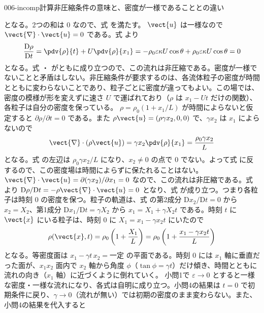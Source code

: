 \documentclass[uplatex,dvipdfmx,a4paper,11pt]{jsarticle}
\begin{document}
\begin{mondai}{006-incomp}{計算}{非圧縮条件の意味と、密度が一様であることとの違い}
\begin{tadashii}
となる。2つの和は 0 なので、式  を満たす。
 $\vect{u}$ は一様なので $\vect{\nabla}\cdot\vect{u} = 0$ である。式  より
\[ \frac{\mathrm{D}\rho}{\mathrm{D}t} = \pdv{\rho}{t} + U\pdv{\rho}{x_1} = -\rho_0\varepsilon\kappa U\cos\theta + \rho_0\varepsilon\kappa U\cos\theta = 0 \]
となる。式 ・ がともに成り立つので、この流れは非圧縮である。密度が一様でないことと矛盾はしない。非圧縮条件が要求するのは、各流体粒子の密度が時間とともに変わらないことであり、粒子ごとに密度が違ってもよい。この場では、密度の模様が形を変えずに速さ $U$ で運ばれており（$\rho$ は $x_1 - Ut$ だけの関数）、各粒子は自分の密度を保っている。
 $\rho = \rho_0(1 + x_1/L)$ が時間によらないと仮定すると $\partial\rho/\partial t = 0$ である。また $\rho\vect{u} = (\rho\gamma x_2, 0, 0)$ で、$\gamma x_2$ は $x_1$ によらないので
\[ \vect{\nabla}\cdot(\rho\vect{u}) = \gamma x_2\pdv{\rho}{x_1} = \frac{\rho_0\gamma x_2}{L} \]
となる。式  の左辺は $\rho_0\gamma x_2/L$ になり、$x_2 \neq 0$ の点で 0 でない。よって式  に反するので、この密度場は時間によらずに保たれることはない。
 $\vect{\nabla}\cdot\vect{u} = \partial(\gamma x_2)/\partial x_1 = 0$ なので、この流れは非圧縮である。式  より $\mathrm{D}\rho/\mathrm{D}t = -\rho\vect{\nabla}\cdot\vect{u} = 0$ となり、式  が成り立つ。つまり各粒子は時刻 0 の密度を保つ。粒子の軌道は、式  の第2成分 $\mathrm{D}x_2/\mathrm{D}t = 0$ から $x_2 = X_2$、第1成分 $\mathrm{D}x_1/\mathrm{D}t = \gamma X_2$ から $x_1 = X_1 + \gamma X_2t$ である。時刻 $t$ に $\vect{x}$ にいる粒子は、時刻 0 に $X_1 = x_1 - \gamma x_2t$ にいたので
\[ \rho(\vect{x},t) = \rho_0\left(1 + \frac{X_1}{L}\right) = \rho_0\left(1 + \frac{x_1 - \gamma x_2t}{L}\right) \]
となる。等密度面は $x_1 - \gamma t\,x_2 = \text{一定}$ の平面である。時刻 0 には $x_1$ 軸に垂直だった面が、$x_1x_2$ 面内で $x_2$ 軸から角度 $\phi$（$\tan\phi = \gamma t$）だけ傾き、時間とともに流れの向き（$x_1$ 軸）に近づくように倒れていく。
\kenzan 小問1で $\varepsilon\to0$ とすると一様な密度・一様な流れになり、各式は自明に成り立つ。小問4の結果は $t = 0$ で初期条件に戻り、$\gamma\to0$（流れが無い）では初期の密度のまま変わらない。また、小問4の結果を代入すると

\end{tadashii}
\end{mondai}
\end{document}
